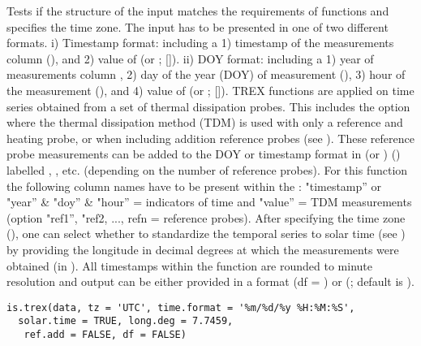 \documentclass[a4paper]{book}
\begin{document}
\begin{Description}\relax
Tests if the structure of the input matches the requirements of  functions
and specifies the time zone. The input has to be presented in one of two different  formats.
i) Timestamp format: including a 1) timestamp of the measurements column (), and
2) value of  (or ; []). ii) DOY format: including a 1) year of measurements column ,
2) day of the year (DOY) of measurement (), 3) hour of the measurement (), and
4) value of  (or ; []). TREX functions are applied on time series obtained from a set of
thermal dissipation probes. This includes the option where the thermal dissipation method (TDM) is
used with only a reference and heating probe, or when including addition reference probes (see ).
These reference probe measurements can be added to the DOY or timestamp format in  (or ) ()
labelled , , etc. (depending on the number of reference probes). For this function the following
column names have to be present within the : "timestamp” or "year” \& "doy” \& "hour” = indicators
of time and "value” = TDM measurements (option "ref1”, "ref2, ..., refn = reference probes).
After specifying the time zone (), one can select whether to standardize the temporal series to solar
time (see ) by providing the longitude in decimal degrees at which the measurements were
obtained (in ). All timestamps within the function are rounded to minute resolution and output can
be either provided in a  format (df = ) or  (; default is ).
\end{Description}
%
\begin{Usage}
\begin{verbatim}
is.trex(data, tz = 'UTC', time.format = '%m/%d/%y %H:%M:%S',
  solar.time = TRUE, long.deg = 7.7459,
   ref.add = FALSE, df = FALSE)
\end{verbatim}
\end{Usage}
%
\end{document}
